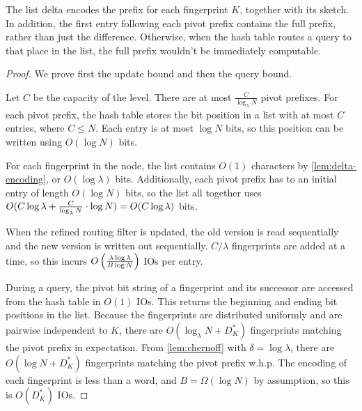 The list delta encodes the prefix for each fingerprint $K$, together with its
sketch. In addition, the first entry following each pivot prefix contains the
full prefix, rather than just the difference. Otherwise, when the hash table
routes a query to that place in the list, the full prefix wouldn't be
immediately computable.


\begin{proof}
	We prove first the update bound and then the query bound.
	
	Let $C$ be the capacity of the level. There are at most
	$\frac{C}{\log_\lambda N}$ pivot prefixes. For each pivot prefix, the hash
	table stores the bit position in a list with at most $C$ entries, where $C
	\leq N$.  Each entry is at most $\log N$ bits, so this position can be
	written using $O(\log N)$ bits.

	For each fingerprint in the node, the list contains $O(1)$ characters by
	\cref{lem:delta-encoding}, or $O(\log \lambda)$ bits. Additionally, each
	pivot prefix has to an initial entry of length $O(\log N)$ bits, so the
	list all together uses $O(C\log\lambda + \frac{C}{\log_\lambda N} \cdot
	\log N)= O(C\log\lambda{})$ bits.

	When the refined routing filter is updated, the old version is read
	sequentially and the new version is written out sequentially. $C/\lambda$
	fingerprints are added at a time, so this incurs
	$O\left(\frac{\lambda\log\lambda{}}{B\log N}\right)$ IOs per entry.

	During a query, the pivot bit string of a fingerprint and its successor are
	accessed from the hash table in $O(1)$ IOs. This returns the beginning and
	ending bit positions in the list. Because the fingerprints are distributed
	uniformly and are pairwise independent to $K$, there are $O(\log_\lambda
	N + D_K^*)$ fingerprints matching the pivot prefix in expectation.  From
	\cref{lem:chernoff} with $\delta=\log\lambda$, there are $O(\log N +
	D_K^*)$ fingerprints matching the pivot prefix w.h.p. The encoding of each
	fingerprint is less than a word, and $B=\Omega(\log N)$ by assumption, so
	this is $O(D_K^*)$ IOs.
\end{proof}

